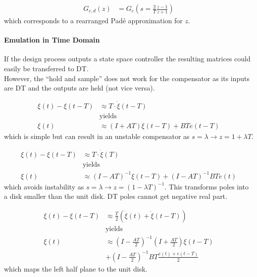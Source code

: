 \noindent\begin{align*}
    G_{c,d}(z) & =G_{c}\left(s=\frac2T\frac{z-1}{z+1}\right)
\end{align*}
which corresponds to a rearranged Padé approximation for $z$.
\paragraph{Emulation in Time Domain}
If the design process outputs a state space controller the resulting matrices could easily be transferred to DT.\\
However, the ``hold and sample'' does not work for the compensator as its inputs are DT and the outputs are held (not vice versa).\\

\noindent\begin{align*}
    \xi(t)-\xi(t-T) & \approx T\cdot\dot{\xi}(t-T)   \\
                    & \text{yields}                  \\
    \xi(t)          & \approx(I+AT)\xi(t-T)+BTe(t-T)
\end{align*}
which is simple but can result in an unstable compensator as $s=\lambda \rightarrow z=1+\lambda T$.\\
%

\noindent\begin{align*}
    \xi(t)-\xi(t-T) & \approx T\cdot\dot{\xi}(T)                       \\
                    & \text{yields}                                    \\
    \xi(t)          & \approx{(I-AT)}^{-1}\xi(t-T)+{(I-AT)}^{-1}BTe(t)
\end{align*}
which avoids instability as $s=\lambda \rightarrow z={(1-\lambda T)}^{-1}$. This transforms poles into a disk smaller than the unit disk. DT poles cannot get negative real part.\\

\noindent\begin{align*}
    \xi(t)-\xi(t-T) & \approx \frac T2\left(\dot{\xi}(t)+\dot{\xi}(t-T)\right) \\
                    & \text{yields}                                            \\
    \xi(t)          & \approx{\left(I-\frac{AT}{2}\right)}^{-1}\left(I+\frac{AT}{2}\right)\xi(t-T)                   \\
                    & +{\left(I-\frac{AT}{2}\right)}^{-1}BT\frac{e(t)+e(t-T)}2
\end{align*}
which maps the left half plane to the unit disk.